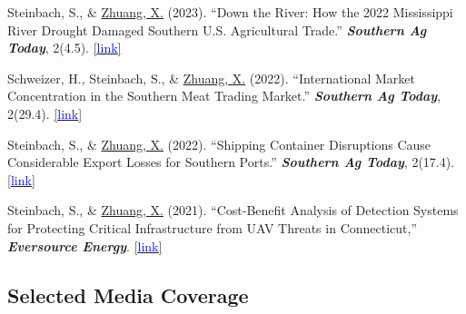 \documentclass[10.5 pt,letterpaper]{article}
\renewenvironment{itemize}{
	\begin{list}{}{
			\setlength{\leftmargin}{1.5em}
		}
	}{
	\end{list}
}
\begin{document}
\begin{itemize}
	
	
	
	\item[-] Steinbach, S., \& \underline{Zhuang, X.} (2023). ``Down the River: How the 2022 Mississippi River Drought Damaged Southern U.S. Agricultural Trade.'' \textit{\textbf{Southern Ag Today}}, 2(4.5).
	\href{https://southernagtoday.org/2023/05/04/down-the-river-how-the-2022-mississippi-river-drought-damaged/}{[{\underline{\textcolor{blue}{link}}}]} 
	
	\item[-] Schweizer, H., Steinbach, S., \& \underline{Zhuang, X.} (2022). ``International Market Concentration in the Southern Meat Trading Market.'' \textit{\textbf{Southern Ag Today}}, 2(29.4).
	\href{https://southernagtoday.org/2022/07/international-market-concentration-in-the-southern-meat-trading-market/}{[{\underline{\textcolor{blue}{link}}}]} 
	
	\item[-] Steinbach, S., \& \underline{Zhuang, X.} (2022). ``Shipping Container Disruptions Cause Considerable Export Losses for Southern Ports.'' \textit{\textbf{Southern Ag Today}}, 2(17.4).
	\href{https://southernagtoday.org/2022/04/shipping-container-disruptions-cause-considerable-export-losses-for-southern-ports/}{[{\underline{\textcolor{blue}{link}}}]} 
	
	\item[-] Steinbach, S., \& \underline{Zhuang, X.} (2021). ``Cost-Benefit Analysis of Detection Systems for Protecting Critical Infrastructure from UAV Threats in Connecticut,'' \textit{\textbf{Eversource Energy}}.
	\href{https://www.dropbox.com/s/hmnrb6rljgsyvei/UConn%20CBA%20Report%202021.pdf?dl=0}{[{\underline{\textcolor{blue}{link}}}]} 
	
	
\end{itemize}



 \subsection*{\textbf{Selected Media Coverage}}
 
\end{document}
